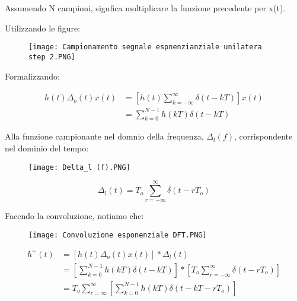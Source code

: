 Assumendo N campioni, signfica moltiplicare la funzione precedente per x(t). \newline 

Utilizzando le figure: 

\begin{figure}[h]
    \centering
    \texttt{[image: Campionamento segnale espnenzianziale unilatera step 2.PNG]}
\end{figure} 

Formalizzando: 

{
    \Large 
    \begin{equation}
        \begin{split}
            h(t) \Delta_o (t) x(t) 
            &= 
            [ h(t) \sum_{k = -\infty}^{\infty} \delta (t - kT) ] x(t) 
            \\ 
            &= 
            \sum_{k = 0}^{N-1} 
            h(kT) \delta (t - kT)   
        \end{split}
    \end{equation}
}

Alla funzione campionante nel domnio della frequenza, $\Delta_l (f)$, corrispondente nel dominio del tempo: 

\begin{figure}[h]
    \centering
    \texttt{[image: Delta\_l (f).PNG]}
\end{figure} 

{
    \Large 
    \begin{equation}
        \Delta_l (t) = T_o \sum_{r = -\infty}^{\infty} \delta (t - rT_o)
    \end{equation}
}

Facendo la convoluzione, notiamo che: 

\begin{figure}[h]
    \centering
    \texttt{[image: Convoluzione esponenziale DFT.PNG]}
\end{figure} 

{
    \Large 
    \begin{equation}
        \begin{split}
            h^{\sim} (t) 
            &= 
            [h (t) \Delta_o (t) x(t)] * \Delta_l (t) 
            \\ 
            &= 
            [\sum_{k = 0}^{N-1} h(kT) \delta(t - kT)] 
            * 
            [T_o \sum_{r = -\infty}^{\infty} \delta (t-rT_o)]
            \\ 
            &= 
            T_o \sum_{r = \infty}^{\infty} [\sum_{k = 0}^{N-1} h(kT) \delta (t - kT -rT_o)]    
        \end{split}
    \end{equation}
}

